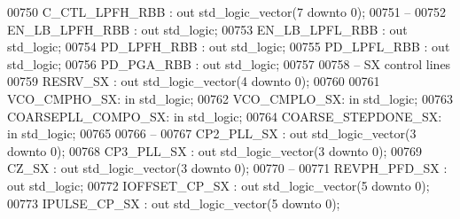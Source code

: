 \begin{DoxyCode}
00750         C\_CTL\_LPFH\_RBB  : \textcolor{keywordflow}{out} \textcolor{comment}{std\_logic\_vector}(\textcolor{vhdllogic}{}\textcolor{vhdllogic}{7} \textcolor{keywordflow}{downto} \textcolor{vhdllogic}{}\textcolor{vhdllogic}{0});
00751 \textcolor{keyword}{        --}
00752         EN\_LB\_LPFH\_RBB  : \textcolor{keywordflow}{out} \textcolor{comment}{std\_logic};
00753         EN\_LB\_LPFL\_RBB  : \textcolor{keywordflow}{out} \textcolor{comment}{std\_logic};
00754         PD\_LPFH\_RBB         : \textcolor{keywordflow}{out} \textcolor{comment}{std\_logic};
00755         PD\_LPFL\_RBB         : \textcolor{keywordflow}{out} \textcolor{comment}{std\_logic};
00756         PD\_PGA\_RBB          : \textcolor{keywordflow}{out} \textcolor{comment}{std\_logic};
00757         
00758 \textcolor{keyword}{        -- SX control lines }
00759         RESRV\_SX    : \textcolor{keywordflow}{out} \textcolor{comment}{std\_logic\_vector}(\textcolor{vhdllogic}{}\textcolor{vhdllogic}{4} \textcolor{keywordflow}{downto} \textcolor{vhdllogic}{}\textcolor{vhdllogic}{0});
00760         
00761         VCO\_CMPHO\_SX:   \textcolor{keywordflow}{in} \textcolor{comment}{std\_logic};
00762         VCO\_CMPLO\_SX:   \textcolor{keywordflow}{in} \textcolor{comment}{std\_logic};
00763         COARSEPLL\_COMPO\_SX: \textcolor{keywordflow}{in} \textcolor{comment}{std\_logic};
00764         COARSE\_STEPDONE\_SX: \textcolor{keywordflow}{in} \textcolor{comment}{std\_logic};
00765         
00766 \textcolor{keyword}{        --}
00767         CP2\_PLL\_SX  : \textcolor{keywordflow}{out} \textcolor{comment}{std\_logic\_vector}(\textcolor{vhdllogic}{}\textcolor{vhdllogic}{3} \textcolor{keywordflow}{downto} \textcolor{vhdllogic}{}\textcolor{vhdllogic}{0});
00768         CP3\_PLL\_SX  : \textcolor{keywordflow}{out} \textcolor{comment}{std\_logic\_vector}(\textcolor{vhdllogic}{}\textcolor{vhdllogic}{3} \textcolor{keywordflow}{downto} \textcolor{vhdllogic}{}\textcolor{vhdllogic}{0});
00769         CZ\_SX               : \textcolor{keywordflow}{out} \textcolor{comment}{std\_logic\_vector}(\textcolor{vhdllogic}{}\textcolor{vhdllogic}{3} \textcolor{keywordflow}{downto} \textcolor{vhdllogic}{}\textcolor{vhdllogic}{0});
00770 \textcolor{keyword}{        --}
00771         REVPH\_PFD\_SX        : \textcolor{keywordflow}{out} \textcolor{comment}{std\_logic};
00772         IOFFSET\_CP\_SX       : \textcolor{keywordflow}{out} \textcolor{comment}{std\_logic\_vector}(\textcolor{vhdllogic}{}\textcolor{vhdllogic}{5} \textcolor{keywordflow}{downto} \textcolor{vhdllogic}{}\textcolor{vhdllogic}{0});
00773         IPULSE\_CP\_SX        : \textcolor{keywordflow}{out} \textcolor{comment}{std\_logic\_vector}(\textcolor{vhdllogic}{}\textcolor{vhdllogic}{5} \textcolor{keywordflow}{downto} \textcolor{vhdllogic}{}\textcolor{vhdllogic}{0});

\end{DoxyCode}
